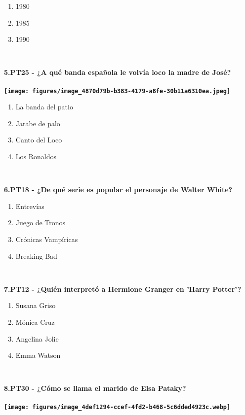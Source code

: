 \documentclass[12pt,a4paper,twoside]{article}
\begin{document}
{\begin{enumerate}[label=\Alph*., itemsep=0.02em]
			\small\item 1980\small\item 1985\small\item 1990
		\end{enumerate}
		}\vspace{1\baselineskip}\\\noindent\parbox[t]{0.9\textwidth}{
		\textbf{
            \small
			5.PT25 - ¿A qué banda española le volvía loco la madre de José?﻿\\\\ \texttt{[image: figures/image\_4870d79b-b383-4179-a8fe-30b11a6310ea.jpeg]}
		}
		\begin{enumerate}[label=\Alph*., itemsep=0.02em]
			\small\item La banda del patio\small\item Jarabe de palo\small\item Canto del Loco\small\item Los Ronaldos
		\end{enumerate}
		}\vspace{1\baselineskip}\\\noindent\parbox[t]{0.9\textwidth}{
		\textbf{
            \small
			6.PT18 - ¿De qué serie es popular el personaje de Walter White?
		}
		\begin{enumerate}[label=\Alph*., itemsep=0.02em]
			\small\item Entrevías\small\item Juego de Tronos\small\item Crónicas Vampíricas\small\item Breaking Bad
		\end{enumerate}
		}\vspace{1\baselineskip}\\\noindent\parbox[t]{0.9\textwidth}{
		\textbf{
            \small
			7.PT12 - ¿Quién interpretó a Hermione Granger en 'Harry Potter'?
		}
		\begin{enumerate}[label=\Alph*., itemsep=0.02em]
			\small\item Susana Griso\small\item Mónica Cruz\small\item Angelina Jolie\small\item Emma Watson
		\end{enumerate}
		}\vspace{1\baselineskip}\\\noindent\parbox[t]{0.9\textwidth}{
		\textbf{
            \small
			8.PT30 - ¿Cómo se llama el marido de Elsa Pataky?﻿\\\\ \texttt{[image: figures/image\_4def1294-ccef-4fd2-b468-5c6dded4923c.webp]}
}}
\end{document}
